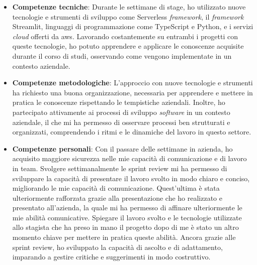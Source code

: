 \begin{itemize}
    \item \textbf{Competenze tecniche}: Durante le settimane di stage, ho utilizzato nuove tecnologie e strumenti di sviluppo come Serverless \textit{framework}, il \textit{framework} Streamlit, linguaggi di programmazione come TypeScript e Python, e i servizi \textit{cloud} offerti da \gls{aws}. Lavorando costantemente su entrambi i progetti con queste tecnologie, ho potuto apprendere e applicare le conoscenze acquisite durante il corso di studi, osservando come vengono implementate in un contesto aziendale.
    \item \textbf{Competenze metodologiche}: L'approccio con nuove tecnologie e strumenti ha richiesto una buona organizzazione, necessaria per apprendere e mettere in pratica le conoscenze rispettando le tempistiche aziendali. Inoltre, ho partecipato attivamente ai processi di sviluppo \textit{software} in un contesto aziendale, il che mi ha permesso di osservare processi ben strutturati e organizzati, comprendendo i ritmi e le dinamiche del lavoro in questo settore.
    \item \textbf{Competenze personali}: Con il passare delle settimane in azienda, ho acquisito maggiore sicurezza nelle mie capacità di comunicazione e di lavoro in team. Svolgere settimanalmente le sprint review mi ha permesso di sviluppare la capacità di presentare il lavoro svolto in modo chiaro e conciso, migliorando le mie capacità di comunicazione. Quest’ultima è stata ulteriormente rafforzata grazie alla presentazione che ho realizzato e presentato all’azienda, la quale mi ha permesso di affinare ulteriormente le mie abilità comunicative. Spiegare il lavoro svolto e le tecnologie utilizzate allo stagista che ha preso in mano il progetto dopo di me è stato un altro momento chiave per mettere in pratica queste abilità. Ancora grazie alle sprint review, ho sviluppato la capacità di ascolto e di adattamento, imparando a gestire critiche e suggerimenti in modo costruttivo.
\end{itemize}

